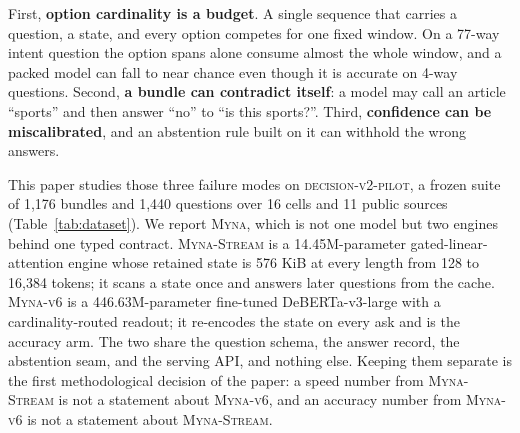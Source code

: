 \documentclass[11pt]{article}
\newcommand{\myna}{\textsc{Myna}}
\newcommand{\stream}{\textsc{Myna-Stream}}
\newcommand{\vsix}{\textsc{Myna-v6}}
\begin{document}
First, \textbf{option cardinality is a budget}. A single sequence that carries a question, a state, and every option competes for one fixed window. On a 77-way intent question the option spans alone consume almost the whole window, and a packed model can fall to near chance even though it is accurate on 4-way questions. Second, \textbf{a bundle can contradict itself}: a model may call an article “sports” and then answer “no” to “is this sports?”. Third, \textbf{confidence can be miscalibrated}, and an abstention rule built on it can withhold the wrong answers.

This paper studies those three failure modes on \textsc{decision-v2-pilot}, a frozen suite of 1{,}176 bundles and 1{,}440 questions over 16 cells and 11 public sources (Table~\ref{tab:dataset}). We report \myna, which is not one model but two engines behind one typed contract. \stream{} is a 14.45M-parameter gated-linear-attention engine whose retained state is 576 KiB at every length from 128 to 16{,}384 tokens; it scans a state once and answers later questions from the cache. \vsix{} is a 446.63M-parameter fine-tuned DeBERTa-v3-large with a cardinality-routed readout; it re-encodes the state on every ask and is the accuracy arm. The two share the question schema, the answer record, the abstention seam, and the serving API, and nothing else. Keeping them separate is the first methodological decision of the paper: a speed number from \stream{} is not a statement about \vsix{}, and an accuracy number from \vsix{} is not a statement about \stream{}.
\end{document}
